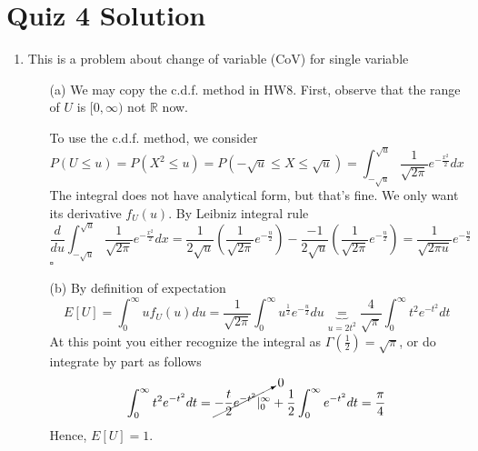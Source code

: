 \documentclass[12pt]{article}
\begin{document}
\noindent
\section*{Quiz 4 Solution}
\begin{enumerate}
\item This is a problem about change of variable (CoV) for single variable 
\begin{itemize}
    \item[(a)] We may copy the c.d.f. method in HW8. First, observe that the range of \(U\) is \([0,\infty)\) not \(\mathbb{R}\) now.   
    
    To use the c.d.f. method, we consider 
    \[
        P(U \leq u) = P(X^2 \leq  u) = P(-\sqrt{u} \leq  X \leq \sqrt{u} ) = \int_{-\sqrt{u} }^{\sqrt{u}} \frac{1}{\sqrt{2\pi } }e^{-\frac{x^2}{2}}dx 
    \]
    The integral does not have analytical form, but that's fine. We only want its derivative \(f_{U}(u) \). By Leibniz integral rule 
    \[
        \frac{d}{du}  \int_{-\sqrt{u} }^{\sqrt{u}} \frac{1}{\sqrt{2\pi } }e^{-\frac{x^2}{2}}dx = \frac{1}{2\sqrt{u}}( \frac{1}{\sqrt{2\pi } }e^{-\frac{u}{2}})  -\frac{-1}{2\sqrt{u}}( \frac{1}{\sqrt{2\pi} }e^{-\frac{u}{2}})  =  \frac{1}{\sqrt{2\pi u } }e^{-\frac{u}{2}}
    \]
    \hspace{\textwidth}\(\square \) 
    \item[(b)] By definition of expectation 
    \[
        E[U] = \int_0^\infty u f_U(u)du = \frac{1}{\sqrt{2\pi } }\int_0^{\infty} u^{\frac{1}{2}} e^{-\frac{u}{2}} du \underbrace{=}_{u = 2t^2}\frac{4}{\sqrt{\pi } }\int_0^{\infty} t^2 e^{-t^2} dt   
    \]
    At this point you either recognize the integral as \(\Gamma (\frac{1}{2}) = \sqrt{\pi } \), or do integrate by part as follows 
    \[
        \int_0^{\infty} t^2e^{-t^2}dt = \cancelto{0}{-\frac{t}{2}e^{-t^2} |_{0}^{\infty}} + \frac{1}{2}\int_0^{\infty} e^{-t^2}dt  = \frac{\pi}{4} 
    \] 
    Hence, \(E[U] = 1\). 


\end{itemize}
\end{enumerate}
\end{document}
